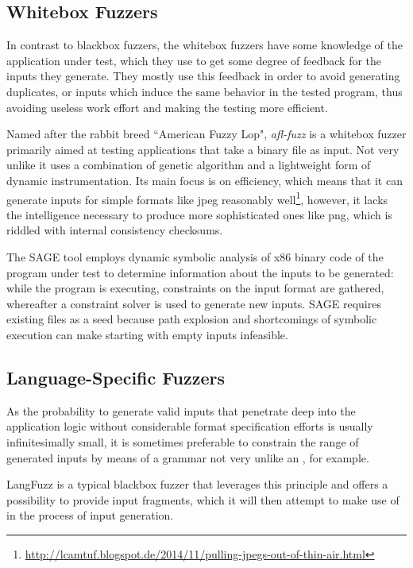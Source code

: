 \subsection{Whitebox Fuzzers}
In contrast to blackbox fuzzers, the whitebox fuzzers have some knowledge of the application under
test, which they use to get some degree of feedback for the inputs they generate. They mostly use this feedback
in order to avoid generating duplicates, or inputs which induce the same behavior in the tested program, thus
avoiding useless work effort and making the testing more efficient.

Named after the rabbit breed ``American Fuzzy Lop", \emph{afl-fuzz}\cite{afl} is a whitebox fuzzer
primarily aimed at testing applications that take a binary file as input. Not very unlike \xmlmate it uses a
combination of genetic algorithm and a lightweight form of dynamic instrumentation. Its main focus is on
efficiency, which means that it can generate inputs for simple formats like jpeg reasonably
well\footnote{\url{http://lcamtuf.blogspot.de/2014/11/pulling-jpegs-out-of-thin-air.html}}, however, it lacks
the intelligence necessary to produce more sophisticated ones like png, which is riddled with internal
consistency checksums.

The SAGE\cite{godefroid-sage} tool employs dynamic symbolic analysis of x86 binary code of the program under
test to determine information about the inputs to be generated: while the program is executing, constraints on
the input format are gathered, whereafter a constraint solver is used to generate new inputs. SAGE requires
existing files as a seed because path explosion and shortcomings of symbolic execution can make starting with
empty inputs infeasible.

\subsection{Language-Specific Fuzzers}
As the probability to generate valid inputs that penetrate deep into the application logic without considerable
format specification efforts is usually infinitesimally small, it is sometimes preferable to constrain the
range of generated inputs by means of a grammar not very unlike an \xsd, for example.

LangFuzz\cite{holler2012} is a typical blackbox fuzzer that leverages this principle and offers a possibility
to provide input fragments, which it will then attempt to make use of in the process of input generation.

